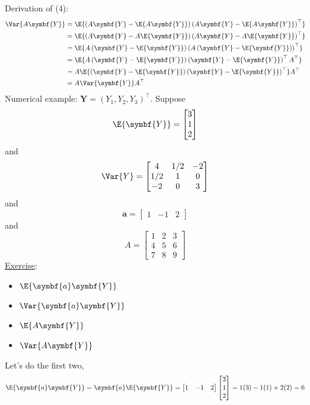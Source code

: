 Derivation of (4):
\begin{align*}
    \Var{A\symbf{Y}}
     & =\E{\left(A\symbf{Y}-\E{A\symbf{Y}}\right)
        \left(A\symbf{Y}-\E{A\symbf{Y}}\right)^\top}                                                 \\
     & =\E{\left( A\symbf{Y}-A\E{\symbf{Y}} \right)
        \left( A\symbf{Y}-A\E{\symbf{Y}} \right)^\top}                                               \\
     & =\E{A\left( \symbf{Y}-\E{\symbf{Y}} \right)
        \left( A\left( \symbf{Y}-\E{\symbf{Y}} \right) \right)^\top}                                 \\
     & =\E{A\left( \symbf{Y}-\E{\symbf{Y}} \right)
        \left( \symbf{Y}-\E{\symbf{Y}} \right)^\top A^\top}                                          \\
     & =A\E{\left( \symbf{Y}-\E{\symbf{Y}} \right)\left( \symbf{Y}-\E{\symbf{Y}} \right)^\top}A^\top \\
     & =A\Var{\symbf{Y}}A^\top
\end{align*}
Numerical example: $ \symbf{Y}=(Y_1,Y_2,Y_3)^\top $. Suppose
\[ \E{\symbf{Y}}=\begin{bmatrix}
        3 \\
        1 \\
        2
    \end{bmatrix} \]
and
\[ \Var{Y}=\begin{bmatrix}
        4   & 1/2 & -2 \\
        1/2 & 1   & 0  \\
        -2  & 0   & 3
    \end{bmatrix} \]
and
\[ \symbf{a}=\begin{bmatrix}
        1 & -1 & 2
    \end{bmatrix} \]
and
\[ A=\begin{bmatrix}
        1 & 2 & 3 \\
        4 & 5 & 6 \\
        7 & 8 & 9
    \end{bmatrix} \]
\underline{Exercise}:
\begin{itemize}
    \item $ \E{\symbf{a}\symbf{Y}} $
    \item $ \Var{\symbf{a}\symbf{Y}} $
    \item $ \E{A\symbf{Y}} $
    \item $ \Var{A\symbf{Y}} $
\end{itemize}
Let's do the first two,
\[ \E{\symbf{a}\symbf{Y}}=\symbf{a}\E{\symbf{Y}}=
    \begin{bmatrix}
        1 & -1 & 2
    \end{bmatrix}\begin{bmatrix}
        3 \\
        1 \\
        2
    \end{bmatrix}=1(3)-1(1)+2(2)=6 \]

